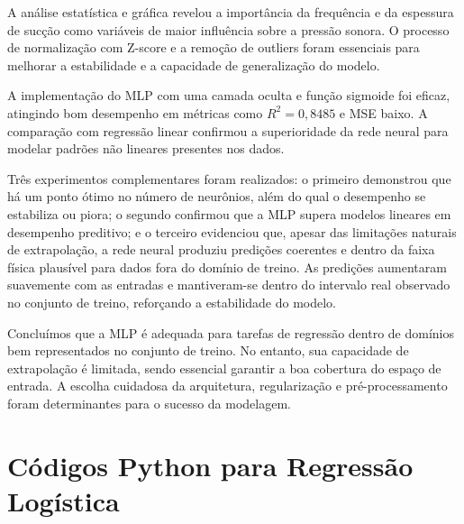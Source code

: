 \documentclass[12pt,a4paper,oneside]{report}
\begin{document}
A análise estatística e gráfica revelou a importância da frequência e da espessura de sucção como variáveis de maior influência sobre a pressão sonora. O processo de normalização com Z-score e a remoção de outliers foram essenciais para melhorar a estabilidade e a capacidade de generalização do modelo.

A implementação do MLP com uma camada oculta e função sigmoide foi eficaz, atingindo bom desempenho em métricas como $R^2 =  0,8485$ e MSE baixo. A comparação com regressão linear confirmou a superioridade da rede neural para modelar padrões não lineares presentes nos dados.

Três experimentos complementares foram realizados: o primeiro demonstrou que há um ponto ótimo no número de neurônios, além do qual o desempenho se estabiliza ou piora; o segundo confirmou que a MLP supera modelos lineares em desempenho preditivo; e o terceiro evidenciou que, apesar das limitações naturais de extrapolação, a rede neural produziu predições coerentes e dentro da faixa física plausível para dados fora do domínio de treino. As predições aumentaram suavemente com as entradas e mantiveram-se dentro do intervalo real observado no conjunto de treino, reforçando a estabilidade do modelo.

Concluímos que a MLP é adequada para tarefas de regressão dentro de domínios bem representados no conjunto de treino. No entanto, sua capacidade de extrapolação é limitada, sendo essencial garantir a boa cobertura do espaço de entrada. A escolha cuidadosa da arquitetura, regularização e pré-processamento foram determinantes para o sucesso da modelagem.




\thispagestyle{empty}
%

\newpage
\appendix

\chapter{Códigos Python para Regressão Logística}
\label{appendix:A}
\thispagestyle{empty}
\end{document}

